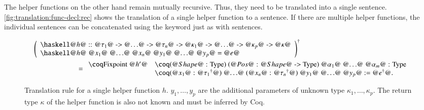 The helper functions on the other hand remain mutually recursive.
Thus, they need to be translated into a single  sentence.
\autoref{fig:translation:func-decl:rec} shows the translation of a single helper function to a  sentence.
If there are multiple helper functions, the individual  sentences can be concatenated using the  keyword just as with  sentences.

\begin{figure}[H]
  \begin{align*}
    &\toCoq{\left(\begin{array}{l}
      \haskellM{@$h$@ :: @$\tau_1$@ -> @$\ldots$@ -> @$\tau_n$@ -> @$\kappa_1$@ -> @$\ldots$@ -> @$\kappa_p$@ -> @$\kappa$@} \\
      \haskellM{@$h$@ @$x_1$@ @$\ldots$@ @$x_n$@ @$y_1$@ @$\ldots$@ @$y_p$@ = @$e$@}
    \end{array}\right)}
    \\
    &\qquad\qquad\qquad=
    \begin{array}{ll}
      \coqM{Fixpoint @$h'$@}
        &\coqM{(@$\Shape$@ : Type) (@$\Pos$@ : @$\Shape$@ -> Type) {@$\alpha_1$@ @$\ldots$@ @$\alpha_m$@ : Type}} \\
        &\coqM{(@$x_1$@ : @$\toCoqX{\tau_1}$@) @$\ldots$@ (@$x_n$@ : @$\toCoqX{\tau_n}$@) @$y_1$@ @$\ldots$@ @$y_p$@ := @$\toCoqX{e}$@.}                                      \\
    \end{array}
  \end{align*}
  \caption{
    Translation rule for a single helper function $h$.
    $y_1, \ldots, y_p$ are the additional parameters of unknown type $\kappa_1, \ldots, \kappa_p$.
    The return type $\kappa$ of the helper function is also not known and must be inferred by Coq.
  }
  \label{fig:translation:func-decl:rec}
\end{figure}
